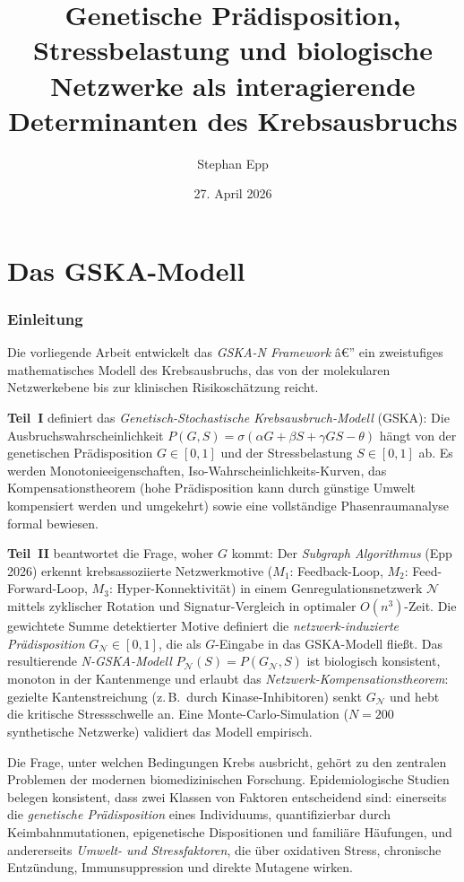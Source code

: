 ﻿\documentclass[12pt, a4paper]{article}
\title{\bfseries Genetische Prädisposition, Stressbelastung und biologische
    Netzwerke als interagierende Determinanten des Krebsausbruchs}
\date{27. April 2026}
\author{Stephan Epp}
\theoremstyle{definition}
\theoremstyle{remark}
\newcommand{\calN}{\mathcal{N}}
\newcommand{\GN}{G_{\calN}}
\begin{document}
\maketitle
\tableofcontents
\newpage




\part{Das GSKA-Modell}
\label{part:gska}


\section{Einleitung}
\label{sec:einleitung}

Die vorliegende Arbeit entwickelt das \emph{GSKA-N Framework} â€”
ein zweistufiges mathematisches Modell des Krebsausbruchs, das von
der molekularen Netzwerkebene bis zur klinischen Risikoschätzung reicht.

\textbf{Teil~I} definiert das \emph{Genetisch-Stochastische Krebsausbruch-Modell}
(GSKA): Die Ausbruchswahrscheinlichkeit $P(G,S) = \sigma(\alpha G + \beta S
+ \gamma GS - \theta)$ hängt von der genetischen Prädisposition $G \in [0,1]$
und der Stressbelastung $S \in [0,1]$ ab. Es werden Monotonieeigenschaften,
Iso-Wahrscheinlichkeits-Kurven, das Kompensationstheorem (hohe Prädisposition
kann durch günstige Umwelt kompensiert werden und umgekehrt) sowie eine
vollständige Phasenraumanalyse formal bewiesen.

\textbf{Teil~II} beantwortet die Frage, woher $G$ kommt: Der
\emph{Subgraph Algorithmus} (Epp 2026) erkennt krebsassoziierte
Netzwerkmotive ($M_1$: Feedback-Loop, $M_2$: Feed-Forward-Loop,
$M_3$: Hyper-Konnektivität) in einem Genregulationsnetzwerk $\calN$
mittels zyklischer Rotation und Signatur-Vergleich in optimaler $O(n^3)$-Zeit.
Die gewichtete Summe detektierter Motive definiert die
\emph{netzwerk-induzierte Prädisposition} $\GN \in [0,1]$,
die als $G$-Eingabe in das GSKA-Modell fließt.
Das resultierende \emph{N-GSKA-Modell} $P_\calN(S) = P(\GN, S)$
ist biologisch konsistent, monoton in der Kantenmenge und erlaubt
das \emph{Netzwerk-Kompensationstheorem}: gezielte Kantenstreichung
(z.\,B.\ durch Kinase-Inhibitoren) senkt $\GN$ und hebt die
kritische Stressschwelle an. Eine Monte-Carlo-Simulation
($N=200$ synthetische Netzwerke) validiert das Modell empirisch.

Die Frage, unter welchen Bedingungen Krebs ausbricht, gehört zu den zentralen
Problemen der modernen biomedizinischen Forschung. Epidemiologische Studien
belegen konsistent, dass zwei Klassen von Faktoren entscheidend sind:
einerseits die \emph{genetische Prädisposition} eines Individuums, quantifizierbar
durch Keimbahnmutationen, epigenetische Dispositionen und familiäre Häufungen,
und andererseits \emph{Umwelt- und Stressfaktoren}, die über oxidativen Stress,
chronische Entzündung, Immunsuppression und direkte Mutagene wirken.
\end{document}
